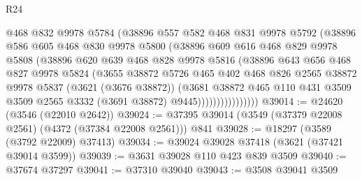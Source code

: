 \begin{lexlean}{R24}
\begin{coremodule}
                      @468
                      @832
                      @9978
                      @5784
                      (@38896
                        @557
                        @582
                        @468
                        @831
                        @9978
                        @5792
                        (@38896
                          @586
                          @605
                          @468
                          @830
                          @9978
                          @5800
                          (@38896
                            @609
                            @616
                            @468
                            @829
                            @9978
                            @5808
                            (@38896
                              @620
                              @639
                              @468
                              @828
                              @9978
                              @5816
                              (@38896
                                @643
                                @656
                                @468
                                @827
                                @9978
                                @5824
                                (@3655
                                  @38872
                                  @5726
                                  @465
                                  @402
                                  @468
                                  @826
                                  @2565
                                  @38872
                                  @9978
                                  @5837
                                  (@3621 (@3676 @38872))
                                  (@3681
                                    @38872
                                    @465
                                    @110
                                    @431
                                    @3509
                                    @3509
                                    @2565
                                    @3332
                                    (@3691 @38872)
                                    @9445))))))))))))))))
@39014 := @24620 (@3546 (@22010 @2642))
@39024 := @37395 @39014 (@3549 (@37379 @22008 @2561) (@4372 (@37384 @22008 @2561))) @841
@39028 := @18297 (@3589 (@3792 @22009) @37413)
@39034 := @39024 @39028 @37418 (@3621 (@37421 @39014 @3599))
@39039 := @3631 @39028 @110 @423 @839 @3509
@39040 := @37674 @37297
@39041 := @37310 @39040
@39043 := @3508 @39041 @3509

\end{coremodule}
\end{lexlean}
